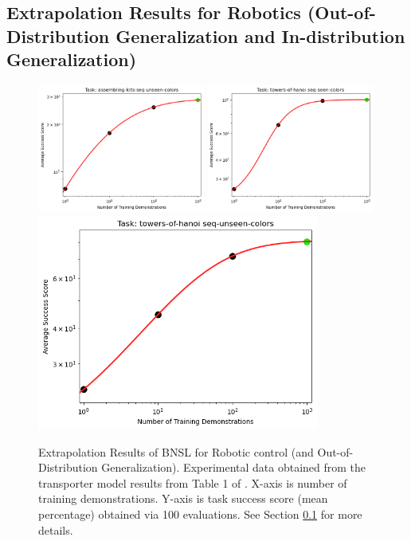 \documentclass{article} %
\begin{document}
\subsection{Extrapolation Results for Robotics (Out-of-Distribution Generalization and In-distribution Generalization)}
\label{section:robot}
\vspace{-3.0mm}
\begin{figure}[htbp]
    \centering
\includegraphics[width=0.49\textwidth]{figures/robot/assembling-kits-seq_unseen-colors.png}
\includegraphics[width=0.49\textwidth]{figures/robot/towers-of-hanoi_seq-seen-colors.png}
\includegraphics[width=0.825\textwidth]{figures/robot/towers-of-hanoi_seq-unseen-colors.png}
\vspace{-3.0mm}
    \caption{
Extrapolation Results of BNSL for Robotic control (and Out-of-Distribution Generalization). Experimental data obtained from the transporter \citep{zeng2021transporter} model results from Table 1 of \cite{shridhar2021cliport}. X-axis is number of training demonstrations. Y-axis is task success score (mean percentage) obtained via 100 evaluations. See Section \ref{section:robot} for more details.
    }
    \label{fig:robot}
\end{figure}
\end{document}
